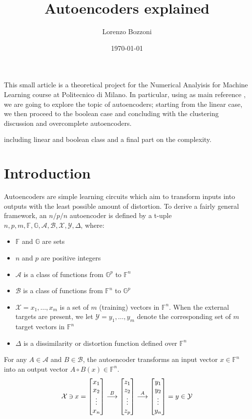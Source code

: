 \documentclass{article}
\title{Autoencoders explained}
\author{Lorenzo Bozzoni}
\date{\today}
\newcommand{\revin}{\mathbin{\rotatebox[origin=c]{180}{$\in$}}}
\begin{document}
\maketitle

This small article is a theoretical project for the Numerical Analyisis for Machine Learning course at Politecnico di Milano. In particular, using as main reference \citep{pmlr-v27-baldi12a}, we are going to explore the topic of autoencoders; starting from the linear case, we then proceed to the boolean case and concluding with the clustering discussion and overcomplete autoencoders.  

including linear and boolean class and a final part on the complexity.

\tableofcontents

\section{Introduction}
Autoencoders are simple learning circuits which aim to transform inputs into outputs with
the least possible amount of distortion. To derive a fairly general framework, an $n/p/n$  autoencoder is defined by a t-uple $n,p,m,\mathbb{F},\mathbb{G},\mathcal{A},\mathcal{B},\mathcal{X},\mathcal{Y}, \Delta$, where:
\begin{itemize}
    \item $\mathbb{F}$ and $\mathbb{G}$ are sets
    \item $n$ and $p$ are positive integers
    \item $\mathcal{A}$ is a class of functions from $\mathbb{G}^p$ to $\mathbb{F}^n$
    \item $\mathcal{B}$ is a class of functions from $\mathbb{F}^n$ to $\mathbb{G}^p$
    \item $\mathcal{X} = {x_1, \dots, x_m}$ is a set of $m$ (training) vectors in $\mathbb{F}^n$. When the external targets are present, we let $\mathcal{Y} = {y_1, \dots, y_m}$ denote the corresponding set of $m$ target vectors in $\mathbb{F}^n$ 
    \item $\Delta$ is a dissimilarity or distortion function defined over $\mathbb{F}^n$
\end{itemize}
For any $A \in \mathcal{A}$ and $B \in \mathcal{B}$, the autoencoder transforms an input vector $x \in \mathbb{F}^n$ into an output vector $A \circ B(x) \in \mathbb{F}^n$.
\[
\mathcal{X} \revin x = 
\begin{bmatrix}
    x_1\\
    x_2\\
    \vdots\\
    x_n
\end{bmatrix}
\overset{B}{\longrightarrow}
\begin{bmatrix}
    z_1\\
    z_2\\
    \vdots\\
    z_p
\end{bmatrix}
\overset{A}{\longrightarrow}
\begin{bmatrix}
    y_1\\
    y_2\\
    \vdots\\
    y_n
\end{bmatrix}
= y \in \mathcal{Y}
\]
\end{document}
